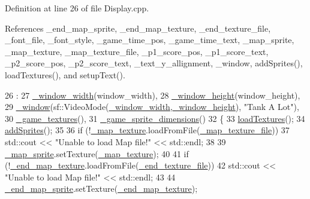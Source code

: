 Definition at line 26 of file Display.\-cpp.



References \-\_\-end\-\_\-map\-\_\-sprite, \-\_\-end\-\_\-map\-\_\-texture, \-\_\-end\-\_\-texture\-\_\-file, \-\_\-font\-\_\-file, \-\_\-font\-\_\-style, \-\_\-game\-\_\-time\-\_\-pos, \-\_\-game\-\_\-time\-\_\-text, \-\_\-map\-\_\-sprite, \-\_\-map\-\_\-texture, \-\_\-map\-\_\-texture\-\_\-file, \-\_\-p1\-\_\-score\-\_\-pos, \-\_\-p1\-\_\-score\-\_\-text, \-\_\-p2\-\_\-score\-\_\-pos, \-\_\-p2\-\_\-score\-\_\-text, \-\_\-text\-\_\-y\-\_\-allignment, \-\_\-window, add\-Sprites(), load\-Textures(), and setup\-Text().


\begin{DoxyCode}
26                                                    :
27     \hyperlink{classDisplay_a715bf4b76abf3b8a8cc495cbb7dfd4b0}{\_window\_width}(window\_width),
28     \hyperlink{classDisplay_a3e66e647786a79f49b985d45e1ad4ac2}{\_window\_height}(window\_height),
29     \hyperlink{classDisplay_aeb0bd9ad8ee786de5f4f0f7c738b1b11}{\_window}(sf::VideoMode(\hyperlink{classDisplay_a715bf4b76abf3b8a8cc495cbb7dfd4b0}{\_window\_width},\hyperlink{classDisplay_a3e66e647786a79f49b985d45e1ad4ac2}{\_window\_height}), \textcolor{stringliteral}{"Tank A Lot"}),
30     \hyperlink{classDisplay_a64ae525710346f1a982efa05b8c53a88}{\_game\_textures}(),
31     \hyperlink{classDisplay_acf0a20ec8a01c1917d62f20ddf2d2f51}{\_game\_sprite\_dimensions}()
32 \{
33     \hyperlink{classDisplay_a5af58e6a5eea9fcf573d2554891de781}{loadTextures}();
34     \hyperlink{classDisplay_a410deedeb944684de238030348d3feab}{addSprites}();
35 
36     \textcolor{keywordflow}{if} (!\hyperlink{classDisplay_aa98ca168c20ac56fe56def6686cf9f91}{\_map\_texture}.loadFromFile(\hyperlink{classDisplay_ac3bdb11a00913038ceeee3171fa99ea3}{\_map\_texture\_file}))
37         std::cout << \textcolor{stringliteral}{"Unable to load Map file!"} << std::endl;
38 
39     \hyperlink{classDisplay_a2ec82cf1355d968c3863c9089ab2e511}{\_map\_sprite}.setTexture(\hyperlink{classDisplay_aa98ca168c20ac56fe56def6686cf9f91}{\_map\_texture});
40 
41     \textcolor{keywordflow}{if} (!\hyperlink{classDisplay_ad41d7097510e56a9f16e97d7cc13c5b6}{\_end\_map\_texture}.loadFromFile(\hyperlink{classDisplay_ac8eb9dbc23ed61c56ea69adfdbfeecde}{\_end\_texture\_file}))
42         std::cout << \textcolor{stringliteral}{"Unable to load Map file!"} << std::endl;
43 
44     \hyperlink{classDisplay_a3bcec98cfc7e32f4fb46e625d76984a0}{\_end\_map\_sprite}.setTexture(\hyperlink{classDisplay_ad41d7097510e56a9f16e97d7cc13c5b6}{\_end\_map\_texture});

\end{DoxyCode}
